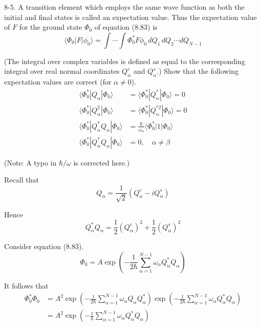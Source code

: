 \documentclass[12pt]{article}
\begin{document}
8-5.
A transition element which employs the same wave
function as both the initial and final states is called an expectation value.
Thus the expectation value of $F$ for the ground state $\Phi_0$ of
equation (8.83) is
\begin{equation*}
\langle\Phi_0|F|\phi_0\rangle
=\int\cdots\int
\Phi_0^*F\phi_0\,dQ_1\,dQ_2\cdots dQ_{N-1}
\tag{8.84}
\end{equation*}

(The integral over complex variables is defined as equal to the
corresponding integral over real normal coordinates $Q_\alpha^c$
and $Q_\alpha^s$.)
Show that the following expectation values are correct (for $\alpha\ne0$).
\begin{align*}
\langle\Phi_0^*|Q_\alpha|\Phi_0\rangle
&=\langle\Phi_0^*|Q_\alpha^*|\Phi_0\rangle=0
\\
\langle\Phi_0^*|Q_\alpha^2|\Phi_0\rangle
&=\langle\Phi_0^*|Q_\alpha^{*2}|\Phi_0\rangle=0
\\
\langle\Phi_0^*|Q_\alpha^*Q_\alpha|\Phi_0\rangle
&=\frac{\hbar}{\omega_\alpha}\langle\Phi_0^*|1|\Phi_0\rangle
\\
\langle\Phi_0^*|Q_\alpha^*Q_\alpha|\Phi_0\rangle&=0,\quad\alpha\ne\beta
\end{align*}

(Note: A typo in $\hbar/\omega$ is corrected here.)

\bigskip
Recall that
\begin{equation*}
Q_\alpha=\frac{1}{\sqrt2}(Q_\alpha^c-iQ_\alpha^s)
\end{equation*}

Hence
\begin{equation*}
Q_\alpha^*Q_\alpha=\frac{1}{2}(Q_\alpha^c)^2+\frac{1}{2}(Q_\alpha^s)^2
\tag{1}
\end{equation*}

Consider equation (8.83).
\begin{equation*}
\Phi_0=A\exp\left(
-\frac{1}{2\hbar}
\sum_{\alpha=1}^{N-1}
\omega_\alpha Q_\alpha^*Q_\alpha
\right)
\tag{8.83}
\end{equation*}

It follows that
\begin{align*}
\Phi_0^*\Phi_0
&=A^2
\exp\left(
-\frac{1}{2\hbar}
\sum_{\alpha=1}^{N-1}
\omega_\alpha Q_\alpha Q_\alpha^*
\right)
\exp\left(
-\frac{1}{2\hbar}
\sum_{\alpha=1}^{N-1}
\omega_\alpha Q_\alpha^*Q_\alpha
\right)
\\
&=A^2
\exp\left(
-\frac{1}{\hbar}
\sum_{\alpha=1}^{N-1}
\omega_\alpha Q_\alpha^*Q_\alpha
\right)
\tag{2}
\end{align*}
\end{document}
